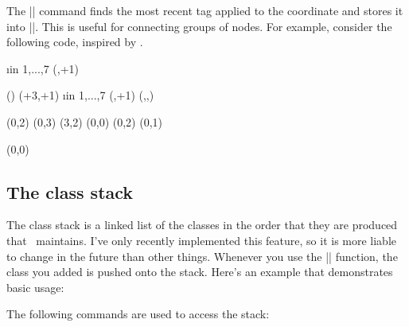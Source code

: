 \begin{sseqdata}[name = basic, cohomological Serre grading]
\begin{command}{\gettag{}}
The |\gettag| command finds the most recent tag applied to the coordinate and stores it into ||. This is useful for connecting groups of nodes. For example, consider the following code, inspired by .
\begin{codeexample}[width=6cm]
\DeclareSseqCommand {} {
    \begin{scope}[#1]
    \foreach\i in {1,...,7}{
        \class(\lastx,\lasty+1)
        \structline
    }
    \end{scope}
    \restorestack
}
\DeclareSseqCommand {} {
    \begin{scope}[#1]
    \gettag\thetag(\lastclass)
    \class(\lastx+3,\lasty+1)
    \structline[gray]
    \savestack
    \foreach\i in {1,...,7}{
        \class(\lastx,\lasty+1)
        \structline
        \structline[gray](,,\thetag)
    }
    \restorestack
    \end{scope}
}
\begin{sseqpage}[ y range = {0}{6}, x tick step = 3,
    xscale=0.6, yscale=1.3 ]
\class(0,2) \class(0,3) \class(3,2)
\class[tag=h_0^i](0,0)
\tower[tag=h_0^i]
\class(0,2) \class(0,1)

\htwotower[tag=h_2 h_0^i](0,0)
\htwotower[tag=h_2 h_0^i]
\end{sseqpage}
\end{codeexample}
\end{command}


\subsection{The class stack}
\label{sec:class stack}
The class stack is a linked list of the classes in the order that they are produced that \sseqpages\  maintains. I've only recently implemented this feature, so it is more liable to change in the future than other things. Whenever you use the |\class| function, the class you added is pushed onto the stack. Here's an example that demonstrates basic usage:


The following commands are used to access the stack:


\end{sseqdata}
